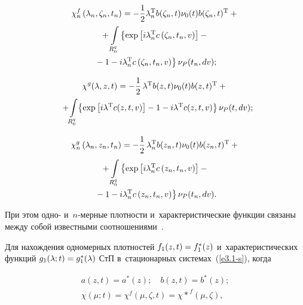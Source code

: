 \begin{multicols}{2}
\vspace*{-14pt}

\noindent
\begin{multline*}
\chi^f_n \left(\lambda_n,\zeta_n, t_n\right) =-\displaystyle\frac{\displaystyle 1\mathstrut}{\displaystyle 2\mathstrut} \lambda^{\mathrm{T}}_n b(\zeta_n,t) \nu_0(t) b(\zeta_n,t)^{\mathrm{T}} +{}\\[-1pt]
{}+ \int\limits_{R_0^q} \left\{ \exp \left[ i\lambda^{\mathrm{T}}_n c\left(\zeta_n,t_n,v\right) \right] -{}\right.\\
\left.{}-1 -i\lambda^{\mathrm{T}}_n 
c\left(\zeta_n, t_n,v\right)\right\} \nu_P (t_n,dv);
\end{multline*}

\vspace*{-14pt}

\noindent
\begin{multline*}
\chi^g (\lambda,z, t) =-\displaystyle\frac{\displaystyle 1\mathstrut}{\displaystyle 2\mathstrut}\, \lambda^{\mathrm{T}} b(z,t) \nu_0(t) b(z,t)^{\mathrm{T}} +{}\\[-1pt]
{}+ \!\int\limits_{R_0^q}\! \left\{ \exp \left[ i\lambda^{\mathrm{T}} c(z,t,v) \right] -1 -i\lambda^{\mathrm{T}} c(z, t,v)\right\} \nu_P (t,dv);\hspace*{-4.42848pt}
\end{multline*}

\vspace*{-14pt}

\noindent
\begin{multline*}
\chi^g_n \left(\lambda_n,z_n, t_n\right) =-\displaystyle\frac{\displaystyle 1\mathstrut}{\displaystyle 2\mathstrut}\, \lambda^{\mathrm{T}}_n b(z_n,t) \nu_0(t) b(z_n,t)^{\mathrm{T}} +{}\\[1pt]
{}+ \int\limits_{R_0^q} \left\{ \exp \left[ i\lambda^{\mathrm{T}}_n c\left(z_n,t_n,v\right) \right] -{}\right.\\[-1pt]
\left.{}-1 -i\lambda^{\mathrm{T}}_n 
c\left(z_n, t_n,v\right)\right\} \nu_P (t_n,dv).
\end{multline*}

  
  \noindent
При этом одно- и~$n$-мер\-ные плотности и~характеристические функции связаны между собой известными соотношениями~\cite{10-sin}.

Для нахождения одномерных плотностей $f_1(z,t) \hm= f_1^* (z)$ и~характеристических функций $g_1(\la;t)\hm = g_1^* (\la)$ СтП 
в~стационарных системах~(\ref{e3.1-s}), когда

  \vspace*{-6pt}
  
  \noindent
  \begin{gather*}
  a(z,t) = a^*(z);\quad b(z,t)=b^*(z);\\
  \chi(\mu;t)= \chi^f(\mu,\zeta, t)={\chi*}^f (\mu, \zeta), %
  \end{gather*}
  

\end{multicols}
